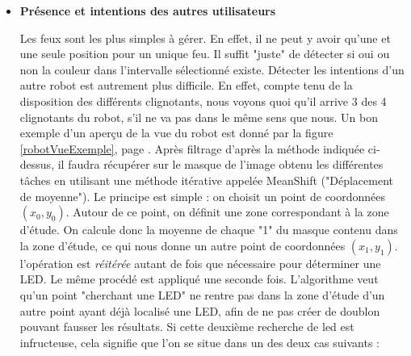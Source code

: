 \begin{itemize}
				\item \textbf{Présence et intentions des autres utilisateurs}

					Les feux sont les plus simples à gérer. En effet, il ne peut y avoir qu'une et une seule position pour un unique feu. Il suffit "juste" de détecter si oui ou non la couleur dans l'intervalle sélectionné existe. Détecter les intentions d'un autre robot est autrement plus difficile. En effet, compte tenu de la disposition des différents clignotants, nous voyons quoi qu'il arrive 3 des 4 clignotants du robot, s'il ne va pas dans le même sens que nous. 
					Un bon exemple d'un aperçu de la vue du robot est donné par la figure \ref{robotVueExemple}, page \pageref{robotVueExemple}.
					Après filtrage d'après la méthode indiquée ci-dessus, il faudra récupérer sur le masque de l'image obtenu les différentes tâches en utilisant une méthode itérative appelée MeanShift ("Déplacement de moyenne"). Le principe est simple : on choisit un point de coordonnées $(x_0,y_0)$. Autour de ce point, on définit une zone correspondant à la zone d'étude. On calcule donc la moyenne de chaque "1" du masque contenu dans la zone d'étude, ce qui nous donne un autre point de coordonnées $(x_1,y_1)$. l'opération est \textit{réitérée} autant de fois que nécessaire pour déterminer une LED. Le même procédé est appliqué une seconde fois. L'algorithme veut qu'un point "cherchant une LED" ne rentre pas dans la zone d'étude d'un autre point ayant déjà localisé une LED, afin de ne pas créer de doublon pouvant fausser les résultats. Si cette deuxième recherche de led est infructeuse, cela signifie que l'on se situe dans un des deux cas suivants :


\end{itemize}
